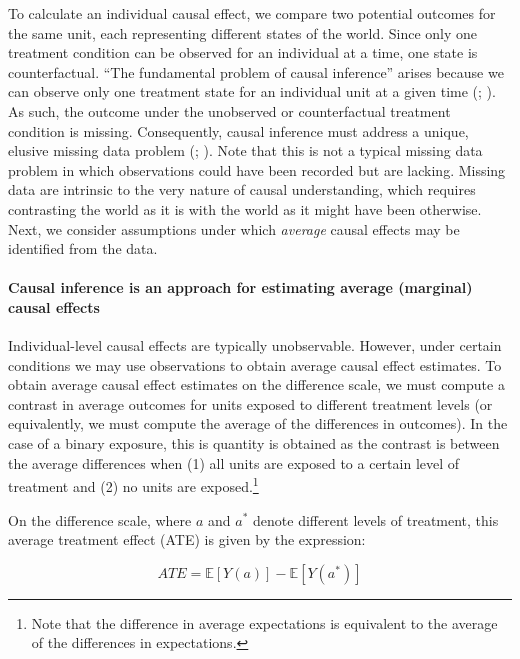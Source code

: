 \documentclass[
  singlecolumn]{article}
\let\oldparagraph\paragraph
\renewcommand{\paragraph}[1]{\oldparagraph{#1}\mbox{}}
\begin{document}
To calculate an individual causal effect, we compare two potential
outcomes for the same unit, each representing different states of the
world. Since only one treatment condition can be observed for an
individual at a time, one state is counterfactual. ``The fundamental
problem of causal inference'' arises because we can observe only one
treatment state for an individual unit at a given time
(;
). As such, the outcome under the
unobserved or counterfactual treatment condition is missing.
Consequently, causal inference must address a unique, elusive missing
data problem (;
). Note that
this is not a typical missing data problem in which observations could
have been recorded but are lacking. Missing data are intrinsic to the
very nature of causal understanding, which requires contrasting the
world as it is with the world as it might have been otherwise. Next, we
consider assumptions under which \emph{average} causal effects may be
identified from the data.

\paragraph{Causal inference is an approach for estimating average
(marginal) causal
effects}\label{causal-inference-is-an-approach-for-estimating-average-marginal-causal-effects}

Individual-level causal effects are typically unobservable. However,
under certain conditions we may use observations to obtain average
causal effect estimates. To obtain average causal effect estimates on
the difference scale, we must compute a contrast in average outcomes for
units exposed to different treatment levels (or equivalently, we must
compute the average of the differences in outcomes). In the case of a
binary exposure, this is quantity is obtained as the contrast is between
the average differences when (1) all units are exposed to a certain
level of treatment and (2) no units are exposed.\footnote{Note that the
  difference in average expectations is equivalent to the average of the
  differences in expectations.}

On the difference scale, where \(a\) and \(a^*\) denote different levels
of treatment, this average treatment effect (ATE) is given by the
expression:

\[
ATE = \mathbb{E}[Y(a)] - \mathbb{E}[Y(a^*)]
\]
\end{document}
